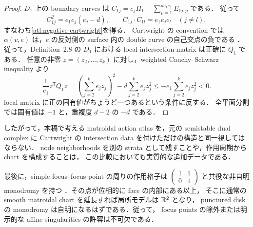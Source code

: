 \begin{proof}
$D_1$ 上の boundary curves は
$C_{1j}=e_jH_1-\sum_{p=1}^{d e_1e_j}E_{1j,p}$ である．
従って
\[
 C_{1j}^2=e_1e_j(e_j-d),\qquad
 C_{1j}\cdot C_{1l}=e_1e_je_l\quad(j\ne l),
\]
すなわち\eqref{atl:negative-cartwright}を得る．
Cartwright の convention では $\alpha(v,e)$ は，$e$ の反対側の
surface 内の double curve の自己交点の負である
\cite[Lemma~2.2]{CartwrightComplexes}．
従って，Definition~2.8 の $D_1$ における local intersection matrix は正確に $Q_1$ である．
任意の非零 $z=(z_2,\ldots,z_k)$ に対し，weighted Cauchy--Schwarz inequality より
\[
 \frac1{e_1}z^{\mathsf T}Q_1z
 =\left(\sum_{j=2}^ke_jz_j\right)^2-d\sum_{j=2}^ke_jz_j^2
 \leq-e_1\sum_{j=2}^ke_jz_j^2<0.
\]
local matrix に正の固有値がちょうど一つあるという条件に反する．
全平面分割では固有値は $-1$ と，重複度 $d-2$ の $-d$ である．
\end{proof}

したがって，本稿で考える matroidal action atlas を，元の semistable dual complex に
Cartwright の intersection data を付けただけの構造と同一視してはならない．
node neighborhoods を別の strata として残すことや，作用周期から chart を構成することは，
この比較においても実質的な追加データである．

最後に，simple focus--focus point の周りの作用格子は
$\left(\begin{smallmatrix}1&1\\0&1\end{smallmatrix}\right)$ と共役な非自明 monodromy を持つ
\cite[Remark~3.1]{VuNgoc}．その点が位相的に face の内部にある以上，
そこに通常の smooth matroidal chart を延長すれば局所モデルは $\mathbb R^2$ となり，
punctured disk の monodromy は自明になるはずである．従って，
focus points の除外または明示的な affine singularities の許容は不可欠である．
